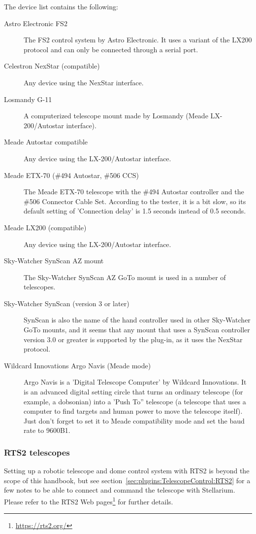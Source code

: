 The device list contains the following:
\begin{description}
\item[Astro Electronic FS2] The FS2 control system by
  Astro Electronic. It uses a variant of the LX200 protocol and can
  only be connected through a serial port.
\item[Celestron NexStar (compatible)] Any device using the NexStar
  interface.
\item[Losmandy G-11] A computerized telescope mount made by Losmandy
  (Meade LX-200/Autostar interface).
\item[Meade Autostar compatible] Any device using the LX-200/Autostar
  interface.
\item[Meade ETX-70 (\#494 Autostar, \#506 CCS)] The Meade ETX-70
  telescope with the \#494 Autostar controller and the \#506 Connector
  Cable Set. According to the tester, it is a bit slow, so its default
  setting of 'Connection delay' is 1.5 seconds instead of 0.5 seconds.
\item[Meade LX200 (compatible)] Any device using the LX-200/Autostar
  interface.
\item[Sky-Watcher SynScan AZ mount] The Sky-Watcher SynScan AZ GoTo
  mount is used in a number of telescopes.
\item[Sky-Watcher SynScan (version 3 or later)] SynScan is also the
  name of the hand controller used in other Sky-Watcher GoTo mounts,
  and it seems that any mount that uses a SynScan controller version
  3.0 or greater is supported by the plug-in, as it uses the NexStar
  protocol.
\item[Wildcard Innovations Argo Navis (Meade mode)] Argo Navis is a
  'Digital Telescope Computer' by Wildcard Innovations. It is an
  advanced digital setting circle that turns an ordinary telescope
  (for example, a dobsonian) into a 'Push To'' telescope (a telescope
  that uses a computer to find targets and human power to move the
  telescope itself). Just don't forget to set it to Meade
  compatibility mode and set the baud rate to 9600B1.
\end{description}

\subsubsection{RTS2 telescopes}
Setting up a robotic telescope and dome control system with RTS2 
is beyond the scope of this handbook, but see section~\ref{sec:plugins:TelescopeControl:RTS2} 
for a few notes to be able to connect and command the telescope with Stellarium.
Please refer to the RTS2 Web pages\footnote{\url{https://rts2.org/}} for further details.

